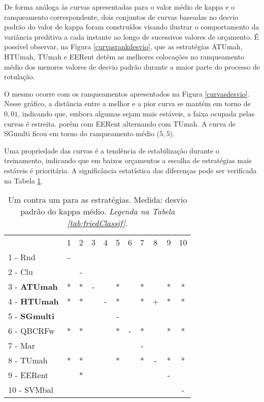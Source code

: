De forma análoga às curvas apresentadas para o valor médio de kappa e o ranqueamento
correspondente, dois conjuntos de curvas baseadas no desvio padrão do valor de kappa foram
construídos visando ilustrar o comportamento da variância preditiva a cada instante ao longo
de sucessivos valores de orçamento.
É possível observar, na Figura \ref{curvasrankdesvio}, que as estratégias ATUmah, HTUmah,
TUmah e EERent detêm as melhores colocações no ranqueamento médio dos menores valores de desvio
padrão durante a maior parte do processo de rotulação.


O mesmo ocorre com os ranqueamentos apresentados na Figura \ref{curvasdesvio}.
Nesse gráfico, a distância entre a melhor e a pior curva se mantém em torno de $0,01$,
indicando que, embora algumas sejam mais estáveis, a faixa ocupada pelas curvas é estreita.
porém com EERent alternando com TUmah.
A curva de SGmulti ficou em torno do ranqueamento médio ($5,5$).

Uma propriedade das curvas é a tendência de estabilização durante o treinamento,
indicando que em baixos orçamentos a escolha de estratégias mais estáveis é prioritária.
A significância estatística das diferenças pode ser verificada na Tabela
\ref{stratsALCKappaFriedAllRiscoReduxall}.
\begin{table}[h]
\caption{Um contra um para as estratégias. Medida: desvio padrão do kappa médio. \textit{Legenda na Tabela \ref{tab:friedClassif}.}}
\begin{center}
\begin{tabular}{lcc|cc|cc|cc|cc}
                                  & 1 & 2 & 3 & 4 & 5 & 6 & 7 & 8 & 9 & 10\\
1 - Rnd                        & - &   &    &   &    &   &    &    &   &   \\
2 - Clu                         &   & - &    &   &    &   &    &    &   &   \\ \hline
3 - \textbf{ATUmah}     & *& * & -  &   & * &   & * &    & * & * \\
4 - \textbf{HTUmah}     & * & * &   & - & * &   & * &  +& * & * \\ \hline
5 - \textbf{SGmulti}       &   &   &    &   & - &   &    &   &   &   \\
6 - QBCRFw                 & * & * &    &   & * & - & * &   & * & * \\ \hline
7 - Mar                        &   &   &    &   &    &   &  - &    &   &   \\
8 - TUmah                   & * & * &    &   & * &   & * &  - & *& * \\ \hline
9 - EERent                   &   & * &    &   &    &   &    &    & - &   \\
10 - SVMbal                 &   &   &    &   &    &   &    &    &   & - \\ \hline\end{tabular}
\label{stratsALCKappaFriedAllRiscoReduxall}
\end{center}
\end{table}

